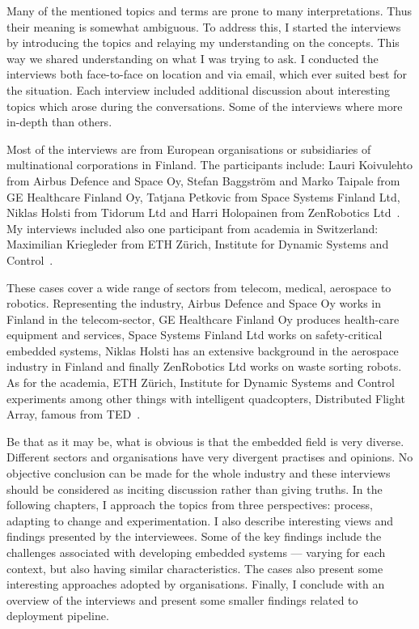 \documentclass[english]{tktltiki2}
\begin{document}
Many of the mentioned topics and terms are prone to many interpretations. Thus their meaning is somewhat ambiguous. To address this, I started the interviews by introducing the topics and relaying my understanding on the concepts. This way we shared understanding on what I was trying to ask. I conducted the interviews both face-to-face on location and via email, which ever suited best for the situation. Each interview included additional discussion about interesting topics which arose during the conversations. Some of the interviews where more in-depth than others.

Most of the interviews are from European organisations or subsidiaries of multinational corporations in Finland. The participants include: Lauri Koivulehto from Airbus Defence and Space Oy, Stefan Baggström and Marko Taipale from GE Healthcare Finland Oy, Tatjana Petkovic from Space Systems Finland Ltd, Niklas Holsti from Tidorum Ltd and Harri Holopainen from ZenRobotics Ltd~\cite{Koi15, BT15, Pet15, Hol15b, Hol15a}. My interviews included also one participant from academia in Switzerland: Maximilian Kriegleder from ETH Zürich, Institute for Dynamic Systems and Control~\cite{Kri15}.

These cases cover a wide range of sectors from telecom, medical, aerospace to robotics. Representing the industry, Airbus Defence and Space Oy works in Finland in the telecom-sector, GE Healthcare Finland Oy produces health-care equipment and services, Space Systems Finland Ltd works on safety-critical embedded systems, Niklas Holsti has an extensive background in the aerospace industry in Finland and finally ZenRobotics Ltd works on waste sorting robots. As for the academia, ETH Zürich, Institute for Dynamic Systems and Control experiments among other things with intelligent quadcopters, Distributed Flight Array, famous from TED~\cite{Dan13}.

Be that as it may be, what is obvious is that the embedded field is very diverse. Different sectors and organisations have very divergent practises and opinions. No objective conclusion can be made for the whole industry and these interviews should be considered as inciting discussion rather than giving truths. In the following chapters, I approach the topics from three perspectives: process, adapting to change and experimentation. I also describe interesting views and findings presented by the interviewees. Some of the key findings include the challenges associated with developing embedded systems — varying for each context, but also having similar characteristics. The cases also present some interesting approaches adopted by organisations. Finally, I conclude with an overview of the interviews and present some smaller findings related to deployment pipeline.
\end{document}

